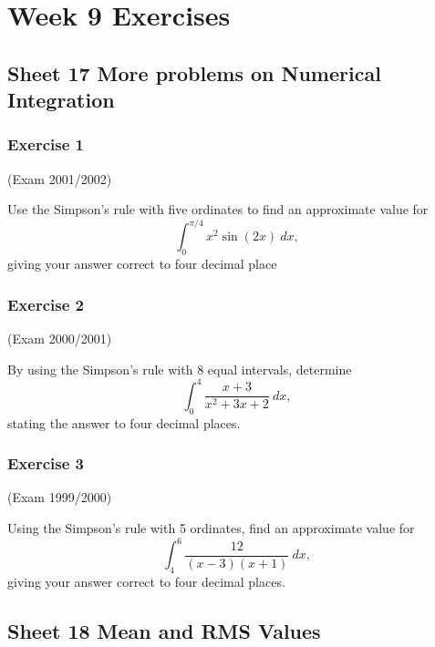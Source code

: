 \documentclass[
  11pt,
  oneside]{book}
\newcommand{\slide}{}
\theoremstyle{definition}
\theoremstyle{definition}
\theoremstyle{definition}
\theoremstyle{definition}
\theoremstyle{remark}
\begin{document}
\chapter*{Week 9 Exercises}\label{week-9-exercises}

\section{Sheet 17 More problems on Numerical Integration}\label{sheet-17-more-problems-on-numerical-integration}

\slide

\subsection*{Exercise 1}\label{exercise-1-8}

(Exam 2001/2002)

Use the Simpson's rule with five ordinates to find an approximate value for
\[
\int_0^{\pi/4}x^2\sin(2x)\ dx,
\]
giving your answer correct to four decimal place

\slide

\subsection*{Exercise 2}\label{exercise-2-8}

(Exam 2000/2001)

By using the Simpson's rule with 8 equal intervals, determine
\[
\int_0^4\frac{x+3}{x^2+3x+2}\ dx,
\]
stating the answer to four decimal places.

\slide

\subsection*{Exercise 3}\label{exercise-3-6}

(Exam 1999/2000)

Using the Simpson's rule with 5 ordinates, find an approximate value for
\[
\int_4^6\frac{12}{(x-3)(x+1)}\ dx,
\]
giving your answer correct to four decimal places.

\slide

\section{Sheet 18 Mean and RMS Values}\label{sheet-18-mean-and-rms-values}
\end{document}
